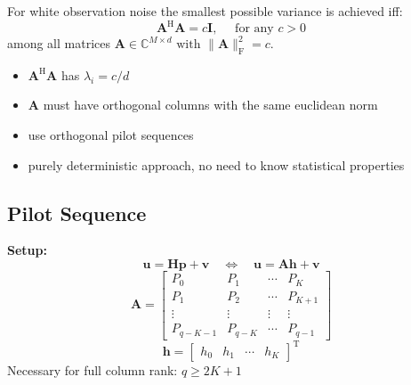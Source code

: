 \documentclass[english]{latex4ei/latex4ei_sheet}
\begin{document}
\begin{sectionbox}
  For white observation noise the smallest possible variance is achieved iff:\\
  $$\boldsymbol{A}^{\mathrm{H}} \boldsymbol{A}=c \mathbf{I}, \quad \text { for any } c>0$$
  among all matrices $\boldsymbol{A} \in \mathbb{C}^{M \times d} \text { with }\|\boldsymbol{A}\|_{\mathrm{F}}^{2}=c$.
  \begin{itemize}
    \item $\boldsymbol{A}^{\mathrm{H}} \boldsymbol{A}$ has $\lambda_i = c/d$
    \item $\boldsymbol{A}$ must have orthogonal columns with the same euclidean norm
    \item use orthogonal pilot sequences
    \item purely deterministic approach, no need to know statistical properties
  \end{itemize}
\end{sectionbox}

\begin{sectionbox}
  \subsection{Pilot Sequence}
  \textbf{Setup:}
  $$\boldsymbol{u}=\boldsymbol{H}\boldsymbol{p}+\boldsymbol{v}\quad\Longleftrightarrow \quad\boldsymbol{u}=\boldsymbol{A} \boldsymbol{h}+\boldsymbol{v}$$
  $$\boldsymbol{A}=\left[\begin{array}{cccc}
    P_{0} & P_{1} & \cdots & P_{K} \\
    P_{1} & P_{2} & \cdots & P_{K+1} \\
    \vdots & \vdots & \vdots & \vdots \\
    P_{q-K-1} & P_{q-K} & \cdots & P_{q-1}
    \end{array}\right]$$
    $$\boldsymbol{h}=\left[\begin{array}{llll}
      h_{0} & h_{1} & \cdots & h_{K}
      \end{array}\right]^{\mathrm{T}}$$
      Necessary for full column rank: $q \geq 2 K+1$
\end{sectionbox}
\end{document}
